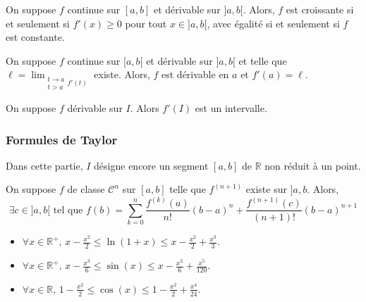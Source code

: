 	\begin{corollary}
		On suppose $f$ continue sur $[a,b]$ et dérivable sur $]a,b[$. Alors, $f$ est croissante si et seulement si $f'(x) \geq 0$ pour tout $x \in ]a,b[$, avec égalité si et seulement si $f$ est constante.
	\end{corollary}

	\begin{corollary}
		On suppose $f$ continue sur $[a,b[$ et dérivable sur $]a,b[$ et telle que $\ell = \lim_{\substack{t \rightarrow a \\ t > a} f'(t)}$ existe. Alors, $f$ est dérivable en $a$ et $f'(a) = \ell$.
	\end{corollary}


	\begin{theorem}[Darboux]
		On suppose $f$ dérivable sur $I$. Alors $f'(I)$ est un intervalle.
	\end{theorem}

	\subsubsection{Formules de Taylor}


	Dans cette partie, $I$ désigne encore un segment $[a,b]$ de $\mathbb{R}$ non réduit à un point.

	\begin{theorem}
		On suppose $f$ de classe $\mathcal{C}^n$ sur $[a,b]$ telle que $f^{(n+1)}$ existe sur $]a,b$. Alors,
		\[ \exists c \in ]a,b[ \text{ tel que } f(b) =  \sum_{k=0}^{n} \frac{f^{(k)} (a)}{n!} (b-a)^n + \frac{f^{(n+1)}(c)}{(n+1)!} (b-a)^{n+1} \]
	\end{theorem}

	\begin{application}
		\begin{itemize}
			\item $\forall x \in \mathbb{R}^+, \, x - \frac{x^2}{2} \leq \ln(1+x) \leq x - \frac{x^2}{2} + \frac{x^3}{3}$.
			\item $\forall x \in \mathbb{R}^+, \, x - \frac{x^3}{6} \leq \sin(x) \leq x - \frac{x^3}{6} + \frac{x^5}{120}$.
			\item $\forall x \in \mathbb{R}, \, 1 - \frac{x^2}{2} \leq \cos(x) \leq 1 - \frac{x^2}{2} + \frac{x^4}{24}$.
		\end{itemize}
	\end{application}

